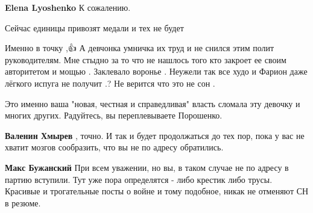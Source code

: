 \begin{itemize}
\begin{itemize}
\textbf{Elena Lyoshenko} К сожалению.
\end{itemize}

 
Сейчас единицы привозят медали и тех не будет

 

Именно в точку ,👍 А девчонка умничка их труд и не снился этим полит
руководителям. Мне стыдно за то что не нашлось того кто закроет ее своим
авторитетом и мощью . Заклевало воронье . Неужели так все худо и Фарион даже
лёгкого испуга не получит .? Не верится что это не сон .


 

Это именно ваша "новая, честная и справедливая" власть сломала эту девочку и
многих других. Радуйтесь, вы переплевываете Порошенко.

\begin{itemize}
 
\textbf{Валенин Хмырев} , точно.
И так и будет продолжаться до тех пор, пока у вас не хватит мозгов сообразить, что вы не по адресу обратились.

 
\textbf{Макс Бужанский} При всем уважении, но вы, в таком случае не по адресу в партию вступили. Тут уже пора определятся - либо крестик либо трусы. Красивые и трогательные посты о войне и тому подобное, никак не отменяют СН в резюме.


\end{itemize}
\end{itemize}
